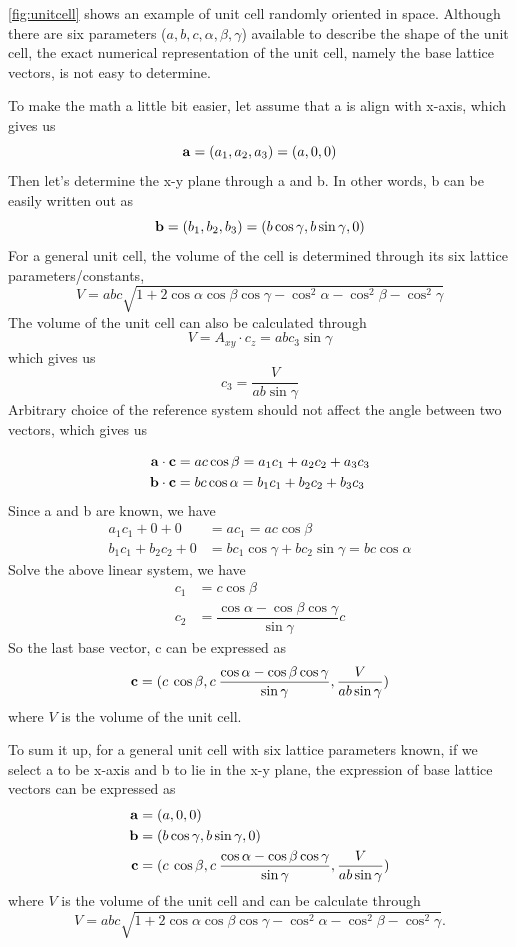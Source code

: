 \documentclass[12pt]{scrartcl}
\begin{document}
\cref{fig:unitcell} shows an example of unit cell randomly oriented in space.
Although there are six parameters ($a,b,c, \alpha, \beta, \gamma$) available to describe the shape of the unit cell, the exact numerical representation of the unit cell, namely the base lattice vectors, is not easy to determine.

To make the math a little bit easier, let assume that \vctr a is align with x-axis, which gives us
\[
	\mathbf{a} = (a_1, a_2, a_3) = (a, 0, 0)
\]
Then let's determine the x-y plane through \vctr a and \vctr b.
In other words, \vctr b can be easily written out as
\[
	\mathbf{b} = (b_1, b_2, b_3) = (b\cos\gamma, b\sin\gamma, 0)
\]
For a general unit cell, the volume of the cell is determined through its six lattice parameters/constants,
\[
	V = abc\sqrt{1 + 2\cos\alpha\cos\beta\cos\gamma - \cos^2\alpha-\cos^2\beta-\cos^2\gamma}
\]
The volume of the unit cell can also be calculated through
\[
	V = A_{xy}\cdot c_z = abc_3\sin\gamma
\]
which gives us
\[
	c_3 = \dfrac{V}{ab\sin\gamma}
\]
Arbitrary choice of the reference system should not affect the angle between two vectors, which gives us

\begin{align*}
	\mathbf{a} \cdot \mathbf{c} &= ac\cos\beta   = a_1c_1 + a_2c_2 + a_3c_3 \\
	\mathbf{b} \cdot \mathbf{c} &= bc\cos\alpha = b_1c_1 + b_2c_2 + b_3c_3
\end{align*}
Since \vctr a and \vctr b are known, we have
\begin{align*}
	a_1c_1 + 0 + 0 &= ac_1 = ac\cos\beta \\
	b_1c_1 + b_2c_2 + 0 &= bc_1\cos\gamma  + bc_2\sin\gamma  = bc\cos\alpha
\end{align*}
Solve the above linear system, we have
\begin{align*}
	c_1 &= c\cos\beta \\
	c_2 &= \dfrac{\cos\alpha - \cos\beta\cos\gamma}{\sin\gamma}c
\end{align*}
So the last base vector, \vctr c can be expressed as
\[
	\mathbf{c} = ( c \: \cos\beta,
	                c \: \dfrac{\cos\alpha - \cos\beta\cos\gamma}{\sin\gamma},
	                \dfrac{V}{ab\sin\gamma})
\]
where $V$ is the volume of the unit cell.

To sum it up, for a general unit cell with six lattice parameters known, if we select \vctr a to be x-axis and \vctr b to lie in the x-y plane, the expression of base lattice vectors can be expressed as
\begin{align*}
	\mathbf{a} &= (a, 0, 0) \\
	\mathbf{b} &= (b\cos\gamma, b\sin\gamma, 0) \\
	\mathbf{c} &= ( c \: \cos\beta,
	                c \: \dfrac{\cos\alpha - \cos\beta\cos\gamma}{\sin\gamma},
	                \dfrac{V}{ab\sin\gamma})
\end{align*}
where $V$ is the volume of the unit cell and can be calculate through
\[
	V = abc\sqrt{1 + 2\cos\alpha\cos\beta\cos\gamma - \cos^2\alpha-\cos^2\beta-\cos^2\gamma}.
\]
\end{document}
